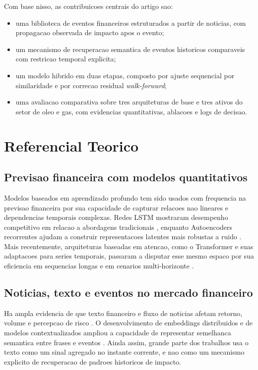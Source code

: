 \documentclass[12pt]{article}
\begin{document}
Com base nisso, as contribuicoes centrais do artigo sao:

\begin{itemize}
    \item uma biblioteca de eventos financeiros estruturados a partir de noticias, com propagacao observada de impacto apos o evento;
    \item um mecanismo de recuperacao semantica de eventos historicos comparaveis com restricao temporal explicita;
    \item um modelo hibrido em duas etapas, composto por ajuste sequencial por similaridade e por correcao residual \textit{walk-forward};
    \item uma avaliacao comparativa sobre tres arquiteturas de base e tres ativos do setor de oleo e gas, com evidencias quantitativas, ablacoes e logs de decisao.
\end{itemize}

\section{Referencial Teorico}

\subsection{Previsao financeira com modelos quantitativos}

Modelos baseados em aprendizado profundo tem sido usados com frequencia na previsao financeira por sua capacidade de capturar relacoes nao lineares e dependencias temporais complexas. Redes LSTM mostraram desempenho competitivo em relacao a abordagens tradicionais \cite{Fischer:2018}, enquanto Autoencoders recorrentes ajudam a construir representacoes latentes mais robustas a ruido \cite{Bao:2017}. Mais recentemente, arquiteturas baseadas em atencao, como o Transformer e suas adaptacoes para series temporais, passaram a disputar esse mesmo espaco por sua eficiencia em sequencias longas e em cenarios multi-horizonte \cite{Vaswani:2017, Lim:2021, Wu:2021}.

\subsection{Noticias, texto e eventos no mercado financeiro}

Ha ampla evidencia de que texto financeiro e fluxo de noticias afetam retorno, volume e percepcao de risco \cite{Tetlock:2007, Tetlock:2008, Loughran:2011, Mitra:2011}. O desenvolvimento de embeddings distribuidos e de modelos contextualizados ampliou a capacidade de representar semelhanca semantica entre frases e eventos \cite{Mikolov:2013, Devlin:2019, Araci:2019, Reimers:2019}. Ainda assim, grande parte dos trabalhos usa o texto como um sinal agregado no instante corrente, e nao como um mecanismo explicito de recuperacao de padroes historicos de impacto.
\end{document}
